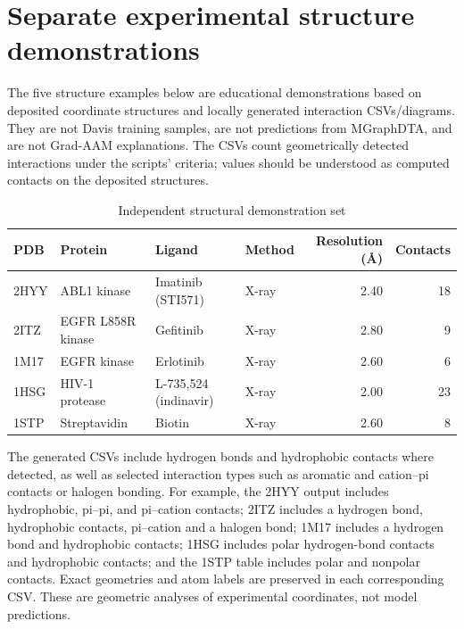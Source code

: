 \section{Separate experimental structure demonstrations}
The five structure examples below are educational demonstrations based on deposited coordinate structures and locally generated interaction CSVs/diagrams. They are not Davis training samples, are not predictions from MGraphDTA, and are not Grad-AAM explanations. The CSVs count geometrically detected interactions under the scripts' criteria; values should be understood as computed contacts on the deposited structures.
\begin{table}[H]\centering\small\caption{Independent structural demonstration set}\label{tab:structures}\begin{tabular}{llllrr}\toprule PDB & Protein & Ligand & Method & Resolution (\AA) & Contacts\\\midrule 2HYY & ABL1 kinase & Imatinib (STI571) & X-ray & 2.40 & 18\\2ITZ & EGFR L858R kinase & Gefitinib & X-ray & 2.80 & 9\\1M17 & EGFR kinase & Erlotinib & X-ray & 2.60 & 6\\1HSG & HIV-1 protease & L-735,524 (indinavir) & X-ray & 2.00 & 23\\1STP & Streptavidin & Biotin & X-ray & 2.60 & 8\\\bottomrule\end{tabular}\end{table}
The generated CSVs include hydrogen bonds and hydrophobic contacts where detected, as well as selected interaction types such as aromatic and cation--pi contacts or halogen bonding. For example, the 2HYY output includes hydrophobic, pi--pi, and pi--cation contacts; 2ITZ includes a hydrogen bond, hydrophobic contacts, pi--cation and a halogen bond; 1M17 includes a hydrogen bond and hydrophobic contacts; 1HSG includes polar hydrogen-bond contacts and hydrophobic contacts; and the 1STP table includes polar and nonpolar contacts. Exact geometries and atom labels are preserved in each corresponding CSV. These are geometric analyses of experimental coordinates, not model predictions.
